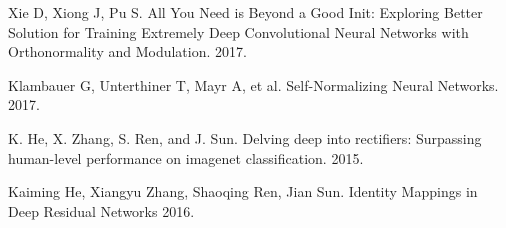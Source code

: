 \documentclass[]{article}
\begin{document}

\begin{thebibliography}{99} %
Xie D, Xiong J, Pu S. All You Need is Beyond a Good Init: Exploring Better Solution for Training Extremely Deep Convolutional Neural Networks with Orthonormality and Modulation. 2017.

Klambauer G, Unterthiner T, Mayr A, et al. Self-Normalizing Neural Networks. 2017.

K. He, X. Zhang, S. Ren, and J. Sun.  Delving deep into rectifiers: Surpassing human-level performance on imagenet classification. 2015.

Kaiming He, Xiangyu Zhang, Shaoqing Ren, Jian Sun.  Identity Mappings in Deep Residual Networks 2016.

\end{thebibliography}

\end{document}
